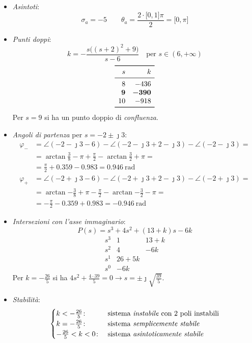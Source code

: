 \begin{esercizio}
\begin{itemize}
	\item \emph{Asintoti}:
		\[
			\sigma_a = -5 \qquad
			\theta_a = \frac{2\cdot\bigl[0,1\bigr]\pi}{2} = \bigl[0,\pi\bigr]
		\]
	\item \emph{Punti doppi}:
		\[
			k = -\frac{s\bigl((s+2)^2+9\bigr)}{s-6} \quad
			\text{per } s \in (6,+\infty)
		\]
		\[\begin{array}{rr}
			\toprule
			     s &         k \\
			\midrule
			     8 &      -436 \\
			\bm{9} & \bm{-390} \\
			    10 &      -918 \\
			\bottomrule
		\end{array}\]
		Per \(s=9\) si ha un punto doppio di \emph{confluenza}.
	\item \emph{Angoli di partenza} per \(s=-2\pm\jmath3\):
		\begin{align*}
			\varphi_- &= \angle(-2-\jmath3-6) -\angle(-2-\jmath3+2-\jmath3) -\angle(-2-\jmath3) = \\
				  &= \arctan{\frac{3}{8}} -\pi +\frac{\pi}{2} -\arctan{\frac{3}{2}} +\pi = \\
				  &= \frac{\pi}{2} +0.359 -0.983 = \SI{0.946}{\radian} \\
			\varphi_+ &= \angle(-2+\jmath3-6) -\angle(-2+\jmath3+2-\jmath3) -\angle(-2+\jmath3) = \\
				  &= \arctan{-\frac{3}{8}} +\pi -\frac{\pi}{2} -\arctan{-\frac{3}{2}} -\pi = \\
				  &= -\frac{\pi}{2} -0.359 +0.983 = \SI{-0.946}{\radian}
		\end{align*}
	\item \emph{Intersezioni con l'asse immaginario}:
		\[
			P(s) = s^3 +4s^2 +(13+k)s -6k
		\]
		\[\begin{array}{r|rr}
			s^3 & 1 & 13+k \\
			s^2 & 4 & -6k  \\
			s^1 & 26+5k    \\
			s^0 & -6k
		\end{array}\]
		Per \(k = -\frac{26}{5}\) si ha \(4s^2+\frac{4\cdot39}{5}=0 \rightarrow s=\pm\jmath\sqrt{\frac{39}{5}}\).
	\item \emph{Stabilità}:
		\[\begin{cases}
			k < -\frac{26}{5}\colon & \text{sistema \emph{instabile} con 2 poli instabili} \\
			k = -\frac{26}{5}\colon & \text{sistema \emph{semplicemente stabile}} \\
			-\frac{26}{5} < k < 0\colon & \text{sistema \emph{asintoticamente stabile}}
		\end{cases}\]
\end{itemize}
\end{esercizio}


